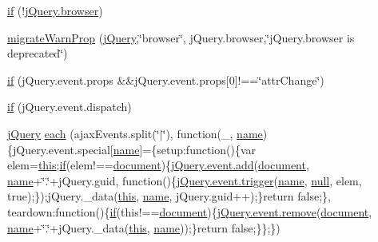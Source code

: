 \begin{DoxyCompactItemize}
\hyperlink{jquery-1_8x_8js_adbd695a57e19ac14f318c59a4e4d854e}{if} (!\hyperlink{jquery-1_8x_8min_8js_acc1ba4586242adc2e962ab3f4b55f78b}{j\+Query.\+browser})
\item 
\hyperlink{jquery-1_8x_8js_aa8be8cdf1878fd7ec123aa2774ec5289}{migrate\+Warn\+Prop} (\hyperlink{xe__solid__enterprise__login_2js_2login_8js_a5d40f04b6bb824963a42ec4b5fbfe262}{j\+Query},\char`\"{}browser\char`\"{}, j\+Query.\+browser,\char`\"{}j\+Query.\+browser is deprecated\char`\"{})
\item 
\hyperlink{jquery-1_8x_8js_a25a937d80a493a68efb2488a512562e6}{if} (j\+Query.\+event.\+props \&\&j\+Query.\+event.\+props\mbox{[}0\mbox{]}!==\char`\"{}attr\+Change\char`\"{})
\item 
\hyperlink{jquery-1_8x_8js_a8da8f2b344a6ebbeb41a061532284553}{if} (j\+Query.\+event.\+dispatch)
\item 
\hyperlink{xe__solid__enterprise__login_2js_2login_8js_a5d40f04b6bb824963a42ec4b5fbfe262}{j\+Query} \hyperlink{jquery-1_8x_8js_a36d6d8263b0ffea1ba23f5a71cad7520}{each} (ajax\+Events.\+split(\char`\"{}$\vert$\char`\"{}), function(\+\_\+, \hyperlink{common_8js_a22c29d2aa8ed6161ce8faa718ef76e68}{name})\{j\+Query.\+event.\+special\mbox{[}\hyperlink{common_8js_a22c29d2aa8ed6161ce8faa718ef76e68}{name}\mbox{]}=\{setup\+:function()\{var elem=\hyperlink{jquery_8parallax-scroll_8min_8js_a05c09a5e9d53fa7adf0a7936038c2fa3}{this};\hyperlink{menu_2tpl_2js_2jquery_8jstree_8js_acba95bef569cfaee32c4ed0212b2bb92}{if}(elem!==\hyperlink{classdocument}{document})\{\hyperlink{common_2js_2jquery_8js_a638fd10c6d2f5e258459b1abfa3b94ea}{j\+Query.\+event.\+add}(\hyperlink{classdocument}{document}, \hyperlink{common_8js_a22c29d2aa8ed6161ce8faa718ef76e68}{name}+\char`\"{}.\char`\"{}+j\+Query.\+guid, function()\{\hyperlink{common_2js_2jquery_8js_a3a2670632785d79909fadd16431e30f9}{j\+Query.\+event.\+trigger}(\hyperlink{common_8js_a22c29d2aa8ed6161ce8faa718ef76e68}{name}, \hyperlink{modernizr_8min_8js_a286f9ec831c5e676eeb493248eab9575}{null}, elem, true);\});j\+Query.\+\_\+data(\hyperlink{jquery_8parallax-scroll_8min_8js_a05c09a5e9d53fa7adf0a7936038c2fa3}{this}, \hyperlink{common_8js_a22c29d2aa8ed6161ce8faa718ef76e68}{name}, j\+Query.\+guid++);\}return false;\}, teardown\+:function()\{\hyperlink{menu_2tpl_2js_2jquery_8jstree_8js_acba95bef569cfaee32c4ed0212b2bb92}{if}(this!==\hyperlink{classdocument}{document})\{\hyperlink{common_2js_2jquery_8js_ac2bfeac9f445211e9176a527d3a292c4}{j\+Query.\+event.\+remove}(\hyperlink{classdocument}{document}, \hyperlink{common_8js_a22c29d2aa8ed6161ce8faa718ef76e68}{name}+\char`\"{}.\char`\"{}+j\+Query.\+\_\+data(\hyperlink{jquery_8parallax-scroll_8min_8js_a05c09a5e9d53fa7adf0a7936038c2fa3}{this}, \hyperlink{common_8js_a22c29d2aa8ed6161ce8faa718ef76e68}{name}));\}return false;\}\};\})
\end{DoxyCompactItemize}
